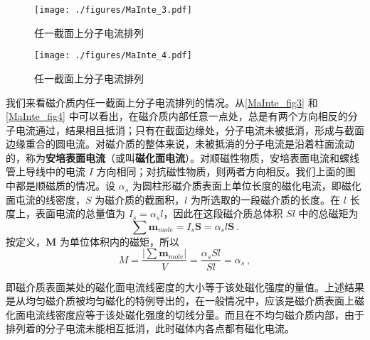 \begin{figure}[ht]
\centering
\texttt{[image: ./figures/MaInte\_3.pdf]}
\caption{任一截面上分子电流排列} \label{MaInte_fig3}
\end{figure}
\begin{figure}[ht]
\centering
\texttt{[image: ./figures/MaInte\_4.pdf]}
\caption{任一截面上分子电流排列} \label{MaInte_fig4}
\end{figure}
我们来看磁介质内任一截面上分子电流排列的情况。从\autoref{MaInte_fig3} 和\autoref{MaInte_fig4} 中可以看出，在磁介质内部任意一点处，总是有两个方向相反的分子电流通过，结果相且抵消；只有在截面边缘处，分子电流未被抵消，形成与截面边缘重合的圆电流。对磁介质的整体来说，未被抵消的分子电流是沿着柱面流动的，称为\textbf{安培表面电流}（或叫\textbf{磁化面电流}）。对顺磁性物质，安培表面电流和螺线管上导线中的电流 $I$ 方向相同；对抗磁性物质，则两者方向相反。我们上面的图中都是顺磁质的情况。设 $\alpha_s$ 为圆柱形磁介质表面上单位长度的磁化电流，即磁化面屯流的线密度，$S$ 为磁介质的截面积，$ l $ 为所选取的一段磁介质的长度。在 $l $ 长度上，表面电流的总量值为 $I_s=\alpha_sl$，因此在这段磁介质总体积 $Sl$ 中的总磁矩为
\begin{equation}
\sum \mathbf{m}_{mole}=I_{s} \mathbf S=\alpha_{s} l \mathbf S~.
\end{equation}
按定义，$\mathbf  M $ 为单位体积内的磁矩，所以
\begin{equation}
M=\frac{\left|\sum \mathbf  m_{mole}\right|}{V}=\frac{\alpha_{s} S l}{S l}=\alpha_s~,
\end{equation}

即磁介质表面某处的磁化面电流线密度的大小等于该处磁化强度的量值。上述结果是从均匀磁介质被均匀磁化的特例导出的，在一般情况中，应该是磁介质表面上磁化面电流线密度应等于该处磁化强度的切线分量。而且在不均匀磁介质内部，由于排列着的分子电流未能相互抵消，此时磁体内各点都有磁化电流。

